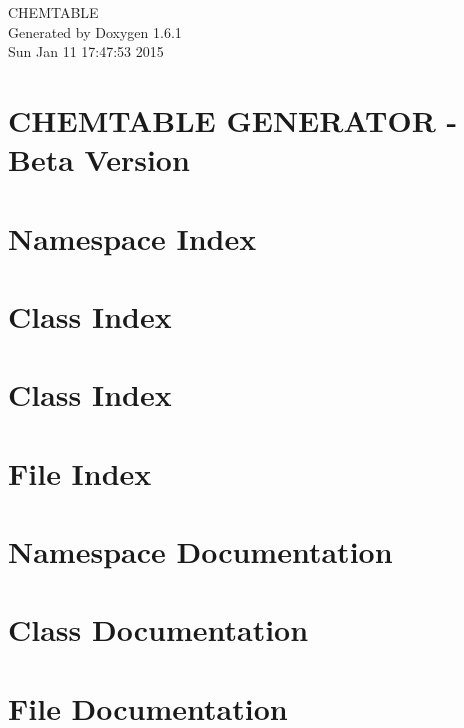 \documentclass[a4paper]{book}
\begin{document}
\hypersetup{pageanchor=false}
\begin{titlepage}
\vspace*{7cm}
\begin{center}
{\Large CHEMTABLE }\\
\vspace*{1cm}
{\large Generated by Doxygen 1.6.1}\\
\vspace*{0.5cm}
{\small Sun Jan 11 17:47:53 2015}\\
\end{center}
\end{titlepage}
\clearemptydoublepage
{}
\tableofcontents
\clearemptydoublepage
{}
\hypersetup{pageanchor=true}
\chapter{CHEMTABLE GENERATOR -\/ Beta Version}
\label{index}\hypertarget{index}{}
\chapter{Namespace Index}

\chapter{Class Index}

\chapter{Class Index}

\chapter{File Index}

\chapter{Namespace Documentation}




\chapter{Class Documentation}




























\chapter{File Documentation}


\printindex
\end{document}
